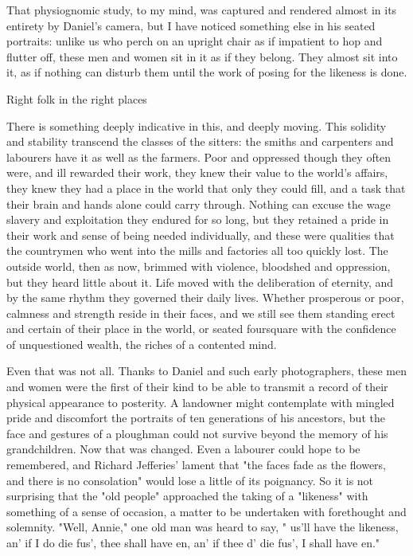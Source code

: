 That physiognomic study, to my mind, was captured and rendered almost in its entirety by Daniel's camera, but I have noticed something else in his seated portraits: unlike us who perch on an upright chair as if impatient to hop and flutter off, these men and women sit in it as if they belong. They almost sit into it, as if nothing can disturb them until the work of posing for the likeness is done. 

 Right folk in the right places

There is something deeply indicative in this, and deeply moving. This solidity and stability transcend the classes of the sitters: the smiths and carpenters and labourers have it as well as the farmers. Poor and oppressed though they often were, and ill rewarded their work, they knew their value to the world's affairs, they knew they had a place in the world that only they could fill, and a task that their brain and hands alone could carry through. Nothing can excuse the wage slavery and exploitation they endured for so long, but they retained a pride in their work and sense of being needed individually, and these were qualities that the countrymen who went into the mills and factories all too quickly lost. The outside world, then as now, brimmed with violence, bloodshed and oppression, but they heard little about it. Life moved with the deliberation of eternity, and by the same rhythm they governed their daily lives. Whether prosperous or poor, calmness and strength reside in their faces, and we still see them standing erect and certain of their place in the world, or seated foursquare with the confidence of unquestioned wealth, the riches of a contented mind.

\Flourish 

Even that was not all. Thanks to Daniel and such early photographers, these men and women were the first of their kind to be able to transmit a record of their physical appearance to posterity. A landowner might contemplate with mingled pride and discomfort the portraits of ten generations of his ancestors, but the face and gestures of a ploughman could not survive beyond the memory of his grandchildren. Now that was changed. Even a labourer could hope to be remembered, and Richard Jefferies' lament that "the faces fade as the flowers, and there is no consolation" would lose a little of its poignancy. So it is not surprising that the "old people" approached the taking of a "likeness" with something of a sense of occasion, a matter to be undertaken with forethought and solemnity. "Well, Annie," one old man was heard to say, " us'll have the likeness, an' if I do die fus', thee shall have en, an' if thee d' die fus', I shall have en."

